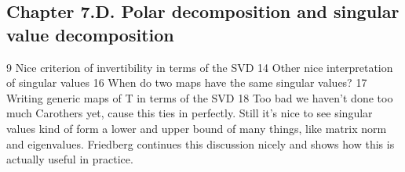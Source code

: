 \subsection*{Chapter 7.D. Polar decomposition and singular value decomposition}

9 Nice criterion of invertibility in terms of the SVD 
14 Other nice interpretation of singular values 
16 When do two maps have the same singular values?
17 Writing generic maps of T in terms of the SVD
18 Too bad we haven't done too much Carothers yet, cause this ties in perfectly. Still it's nice to see singular values kind of form a lower and upper bound of many things, like matrix norm and eigenvalues. Friedberg continues this discussion nicely and shows how this is actually useful in practice.


